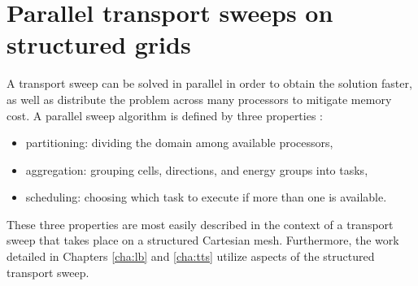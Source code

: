\documentclass[times,final]{elsarticle}
\newcommand{\tcr}[1]{\textcolor{red}{#1}}
\begin{document}
\section{Parallel transport sweeps on structured grids}\label{cha:parallel_transport}

A transport sweep can be solved in parallel in order to obtain the solution faster, as well as distribute the problem across many processors to mitigate memory cost.
A parallel sweep algorithm is defined by three properties \cite{mpadams2013} :
\begin{itemize}
\item partitioning: dividing the domain among available processors,
\item aggregation: grouping cells, directions, and energy groups into tasks,
\item scheduling: choosing which task to execute if more than one is available.
\end{itemize}

These three properties are most easily described in the context of a  transport sweep that takes place on a structured Cartesian mesh.
Furthermore, the work detailed in Chapters \ref{cha:lb} and \ref{cha:tts} utilize aspects of the structured transport sweep.
\end{document}
